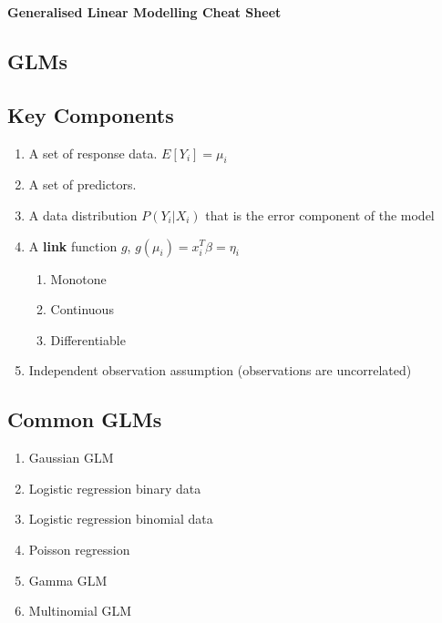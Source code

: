 \documentclass[10pt,landscape, fleqn]{article}
\begin{document}
	\raggedright
	\footnotesize
	
	\begin{center}
		\Large{\textbf{Generalised Linear Modelling Cheat Sheet}} \\
	\end{center}
	\begin{multicols}{3}
		\setlength{\premulticols}{1pt}
		\setlength{\postmulticols}{1pt}
		\setlength{\multicolsep}{1pt}
		\setlength{\columnsep}{2pt}
		
		\section{GLMs}
			\subsection{Key Components}
				\begin{enumerate}
					\item A set of response data. $E[Y_i] = \mu_i$
					\item A set of predictors. 
					\item A data distribution $P(Y_i|X_i)$ that is the error component of the model
					\item A \textbf{link} function $g$, $g(\mu_i) = x_i^T\beta = \eta_i$
						  \begin{enumerate}
						  	\item Monotone
						  	\item Continuous
						  	\item Differentiable
						  \end{enumerate}
					\item Independent observation assumption (observations are uncorrelated)
				\end{enumerate}
			\subsection{Common GLMs}
				\begin{enumerate}
					\item Gaussian GLM
					\item Logistic regression binary data
					\item Logistic regression binomial data
					\item Poisson regression
					\item Gamma GLM
					\item Multinomial GLM
				\end{enumerate}

\end{multicols}
\end{document}
